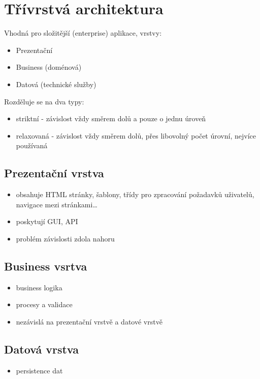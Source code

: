\documentclass{szzclass}
\author{Jakub Rathouský}
\begin{document}
\tableofcontents
\newpage

\section{Třívrstvá architektura}
Vhodná pro složitější (enterprise) aplikace, vrstvy:
\begin{itemize}
    \item Prezentační
    \item Business (doménová)
    \item Datová (technické služby)
\end{itemize}

Rozděluje se na dva typy:
\begin{itemize}
    \item striktní - závislost vždy směrem dolů a pouze o jednu úroveň
    \item relaxovaná - závislost vždy směrem dolů, přes libovolný počet úrovní, nejvíce používaná
\end{itemize}
\subsection{Prezentační vrstva}
\begin{itemize}
    \item obsahuje HTML stránky, šablony, třídy pro zpracování požadavků uživatelů, navigace mezi stránkami\dots
    \item poskytují GUI, API
    \item problém závislosti zdola nahoru
\end{itemize}
\subsection{Business vsrtva}
\begin{itemize}
    \item business logika
    \item procesy a validace
    \item nezávislá na prezentační vrstvě a datové vrstvě
\end{itemize}
\subsection{Datová vrstva}
\begin{itemize}
    \item persistence dat
\end{itemize}
\end{document}
